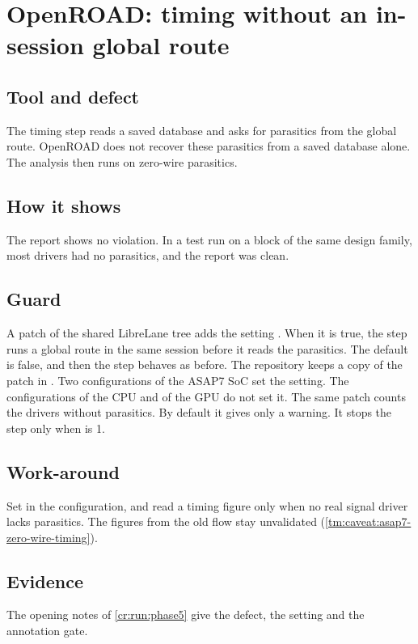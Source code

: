 \section{OpenROAD: timing without an in-session global route}\label{tm:defect:sta-without-in-session-route}
\subsection*{Tool and defect}
The timing step reads a saved database and asks for parasitics from the global route. OpenROAD does not recover these parasitics from a saved database alone. The analysis then runs on zero-wire parasitics.

\subsection*{How it shows}
The report shows no violation. In a test run on a block of the same design family, most drivers had no parasitics, and the report was clean.

\subsection*{Guard}
A patch of the shared LibreLane tree adds the setting . When it is true, the step runs a global route in the same session before it reads the parasitics. The default is false, and then the step behaves as before. The repository keeps a copy of the patch in . Two configurations of the ASAP7 SoC set the setting. The configurations of the CPU and of the GPU do not set it. The same patch counts the drivers without parasitics. By default it gives only a warning. It stops the step only when  is 1.

\subsection*{Work-around}
Set  in the configuration, and read a timing figure only when no real signal driver lacks parasitics. The figures from the old flow stay unvalidated (\cref{tm:caveat:asap7-zero-wire-timing}).

\subsection*{Evidence}
The opening notes of \cref{cr:run:phase5} give the defect, the setting and the annotation gate.

